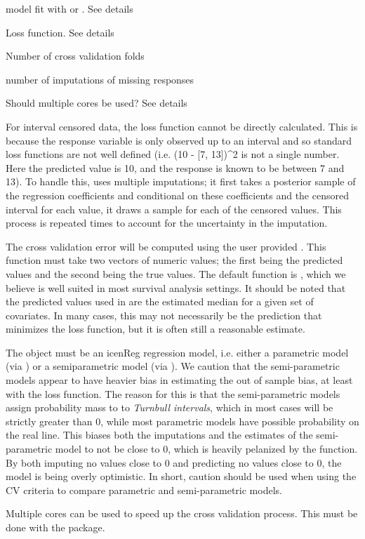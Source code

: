 \documentclass[a4paper]{book}
\begin{document}
%
\begin{Arguments}
\begin{ldescription}
\item[\code{fit}] model fit with  or . See details 
\item[\code{loss\_fun}] Loss function. See details
\item[\code{folds}] Number of cross validation folds
\item[\code{numImputes}] number of imputations of missing responses
\item[\code{useMCore}] Should multiple cores be used? See details
\end{ldescription}
\end{Arguments}
%
\begin{Details}\relax
For interval censored data, the loss function cannot be directly calculated. This is because 
the response variable is only observed up to an interval and so standard loss functions 
are not well defined (i.e. (10 - [7, 13])\textasciicircum{}2 is not a single number. Here the predicted value
is 10, and the response is known to be between 7 and 13). To handle this, 
uses multiple imputations; it first takes a posterior sample of the regression coefficients
and conditional on these coefficients and the censored interval for each value, it draws a sample
for each of the censored values. This process is repeated  times to account
for the uncertainty in the imputation. 

The cross validation error will be computed using the user provided . This function
must take two vectors of numeric values; the first being the predicted values and the second being
the true values. The default function is , which we believe is well suited in most 
survival analysis settings. It should be noted that the predicted values used in 
are the estimated median for a given set of covariates. In many cases, this may not necessarily be
the prediction that minimizes the loss function, but it is often still a reasonable estimate.

The object  must be an icenReg regression model, i.e. either a parametric model 
(via ) or a semiparametric model (via ). We caution that the 
semi-parametric models appear to have heavier bias in estimating the out of sample bias, at 
least with the  loss function. The reason for this is that the semi-parametric
models  assign probability mass to to \emph{Turnbull intervals}, which in most cases
will be strictly greater than 0, while most parametric models have possible probability on the real
line. This biases both the imputations and the estimates of the semi-parametric model to not 
be close to 0, which is heavily pelanized by the  function. By both imputing no 
values close to 0 and predicting no values close to 0, the  model is being overly
optimistic. In short, caution
should be used when using the CV criteria to compare parametric and semi-parametric models. 

Multiple cores can be used to speed up the cross validation process. This must be done with 
the  package. 
\end{Details}
\end{document}
